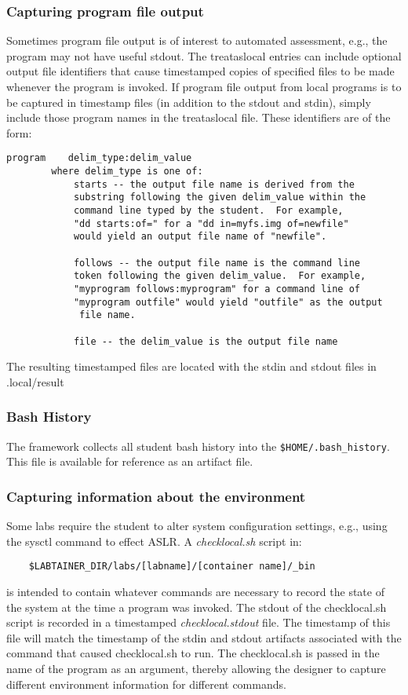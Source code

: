 \documentclass[12pt]{article}
\begin{document}
\subsubsection{Capturing program file output}
Sometimes program file output is of interest to automated assessment, e.g., the program
may not have useful stdout.
The treataslocal entries can include optional output file identifiers that
cause timestamped copies of specified files to be made whenever the program is invoked.  
If program file output from local programs is to be captured in timestamp files (in addition
to the stdout and stdin), simply include those program names in the treataslocal file.
These identifiers are of the form:
\begin{verbatim}
program    delim_type:delim_value
        where delim_type is one of:
            starts -- the output file name is derived from the 
            substring following the given delim_value within the 
            command line typed by the student.  For example, 
            "dd starts:of=" for a "dd in=myfs.img of=newfile" 
            would yield an output file name of "newfile".
     
            follows -- the output file name is the command line 
            token following the given delim_value.  For example, 
            "myprogram follows:myprogram" for a command line of
            "myprogram outfile" would yield "outfile" as the output 
             file name.

            file -- the delim_value is the output file name
\end{verbatim}
\noindent The resulting timestamped files are located with the stdin and stdout files in .local/result
\subsubsection{Bash History}
The framework collects all student bash history into the \texttt{\$HOME/.bash\_history}.  This file is
available for reference as an artifact file.

\subsubsection{Capturing information about the environment}
Some labs require the student to alter system configuration settings,
e.g., using the sysctl command to effect ASLR. A \textit{checklocal.sh} script in:
\begin{verbatim}
    $LABTAINER_DIR/labs/[labname]/[container name]/_bin
\end{verbatim}
is intended to contain whatever commands are necessary to record the 
state of the system at the time a program was invoked.  The stdout of
the checklocal.sh script is recorded in a timestamped \textit{checklocal.stdout}
file.  The timestamp of this file will match the timestamp of the stdin and
stdout artifacts associated with the command that caused checklocal.sh to run.
The checklocal.sh is passed in the name of the program as an argument, thereby
allowing the designer to capture different environment information for different commands.
\end{document}
